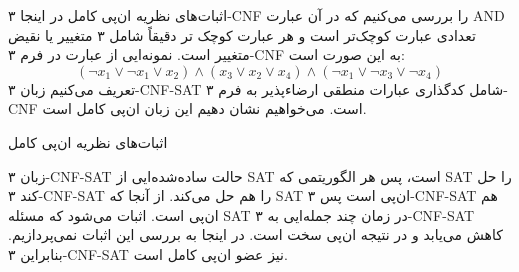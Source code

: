 \begin{itemframe}{اثبات‌های نظریه ان‌پی کامل}
\itm
در اینجا ۳-CNF را بررسی می‌کنیم که در آن عبارت AND تعدادی عبارت کوچک‌تر است و هر عبارت کوچک تر دقیقاً شامل ۳ متغییر یا نقیض متغییر است. نمونه‌ایی از عبارت در فرم ۳-CNF به این صورت است:
$$
(\lnot x_1 \lor \lnot x_1 \lor x_2) \land (x_3 \lor x_2 \lor x_4) \land (\lnot x_1 \lor \lnot x_3 \lor \lnot x_4)
$$
\itm
تعریف می‌کنیم زبان ۳-CNF-SAT شامل کدگذاری عبارات منطقی ارضاءپذیر به فرم ۳-CNF‌ است. می‌خواهیم نشان دهیم این زبان ان‌پی کامل است.
\end{itemframe}


\begin{itemframe}{اثبات‌های نظریه ان‌پی کامل}

 \itm
زبان ۳-CNF-SAT حالت ساد‌ه‌شده‌ایی از SAT است، پس هر الگوریتمی که SAT را حل کند ۳-CNF-SAT را هم حل می‌کند. از آنجا که SAT ان‌پی است پس ۳-CNF-SAT هم ان‌پی است.
 \itm
اثبات می‌شود که مسئله SAT در زمان چند جمله‌ایی به ۳-CNF-SAT کاهش می‌یابد و در نتیجه ان‌پی سخت است.
در اینجا به بررسی این اثبات نمی‌پردازیم.
 \itm
بنابراین ۳-CNF-SAT نیز عضو ان‌پی کامل است.
\end{itemframe}

